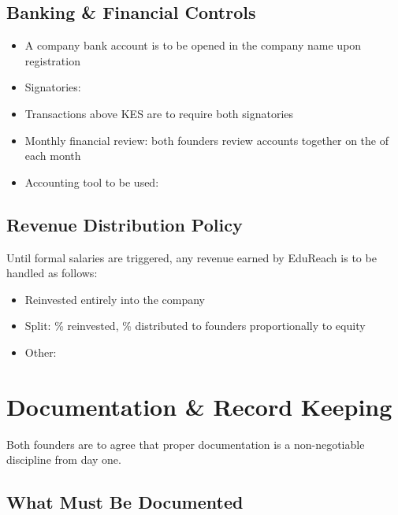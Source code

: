 \documentclass[12pt,a4paper]{article}
\newcommand{\blank}[1][5.5cm]{\underline{\hspace{#1}}}
\newcommand{\cb}{$\square$\;}                   %
\begin{document}
\subsection{Banking \& Financial Controls}

\begin{itemize}
  \item A company bank account is to be opened in the company name upon registration
  \item Signatories: \blank[6cm]
  \item Transactions above KES \blank[3cm] are to require both signatories
  \item Monthly financial review: both founders review accounts together on the \blank[1.5cm] of each month
  \item Accounting tool to be used: \blank[4cm]
\end{itemize}

\subsection{Revenue Distribution Policy}

Until formal salaries are triggered, any revenue earned by EduReach is to be handled as follows:

\begin{itemize}[label=\cb]
  \item Reinvested entirely into the company
  \item Split: \blank[1.5cm]\% reinvested, \blank[1.5cm]\% distributed to founders proportionally to equity
  \item Other: \blank[7cm]
\end{itemize}

\section{Documentation \& Record Keeping}

Both founders are to agree that proper documentation is a non-negotiable discipline from day one.

\subsection{What Must Be Documented}
\end{document}
